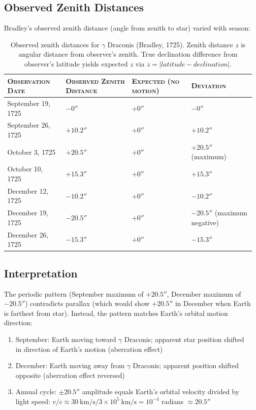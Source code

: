 \subsection{Observed Zenith Distances}

Bradley's observed zenith distance (angle from zenith to star) varied with season:

\begin{table}
\centering
\caption{Observed zenith distances for $\gamma$ Draconis (Bradley, 1725). Zenith distance $z$ is angular distance from observer's zenith. True declination difference from observer's latitude yields expected $z$ via $z = |latitude - declination|$.}
\label{tab:bradley-observations}
\large
\begin{tabularx}{\linewidth}{lXlX}
  \toprule
  \textsc{Observation Date} & \textsc{Observed Zenith Distance} & \textsc{Expected (no motion)} & \textsc{Deviation} \\
  \midrule
  September 19, 1725 & $-0''$ & $+0''$ & $-0''$ \\
  September 26, 1725 & $+10.2''$ & $+0''$ & $+10.2''$ \\
  October 3, 1725 & $+20.5''$ & $+0''$ & $+20.5''$ (maximum) \\
  October 10, 1725 & $+15.3''$ & $+0''$ & $+15.3''$ \\
  \midrule
  December 12, 1725 & $-10.2''$ & $+0''$ & $-10.2''$ \\
  December 19, 1725 & $-20.5''$ & $+0''$ & $-20.5''$ (maximum negative) \\
  December 26, 1725 & $-15.3''$ & $+0''$ & $-15.3''$ \\
  \bottomrule
\end{tabularx}
\end{table}

\subsection{Interpretation}

The periodic pattern (September maximum of $+20.5''$, December maximum of $-20.5''$) contradicts parallax (which would show $+20.5''$ in December when Earth is farthest from star). Instead, the pattern matches Earth's orbital motion direction:

\begin{enumerate}
\item September: Earth moving toward $\gamma$ Draconis; apparent star position shifted in direction of Earth's motion (aberration effect)
\item December: Earth moving away from $\gamma$ Draconis; apparent position shifted opposite (aberration effect reversed)
\item Annual cycle: $\pm 20.5''$ amplitude equals Earth's orbital velocity divided by light speed: $v/c \approx 30~\text{km/s} / 3 \times 10^5~\text{km/s} = 10^{-4}$ radians $\approx 20.5''$
\end{enumerate}


